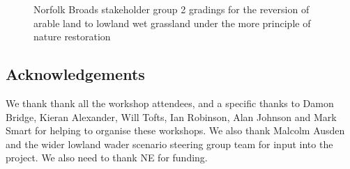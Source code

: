 \documentclass[
  12pt,
  letterpaper,
  DIV=11,
  numbers=noendperiod]{scrartcl}
\begin{document}
\begin{figure}[H]


\caption{\label{fig-BroadsArMoreG2}Norfolk Broads stakeholder group 2
gradings for the reversion of arable land to lowland wet grassland under
the more principle of nature restoration}

\end{figure}%

\newpage{}

\subsection{Acknowledgements}\label{acknowledgements}

We thank thank all the workshop attendees, and a specific thanks to
Damon Bridge, Kieran Alexander, Will Tofts, Ian Robinson, Alan Johnson
and Mark Smart for helping to organise these workshops. We also thank
Malcolm Ausden and the wider lowland wader scenario steering group team
for input into the project. We also need to thank NE for funding.

\newpage{}
\end{document}
